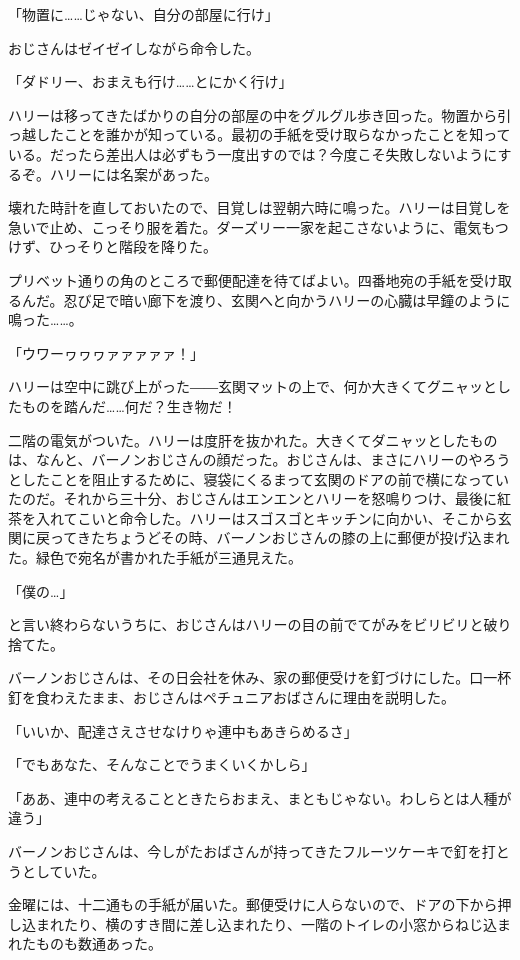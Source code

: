 \documentclass[10pt,a4paper]{article}
\begin{document}
\begin{CJK}{UTF8}{min}
「物置に……じゃない、自分の部屋に行け」

おじさんはゼイゼイしながら命令した。

「ダドリー、おまえも行け……とにかく行け」

ハリーは移ってきたばかりの自分の部屋の中をグルグル歩き回った。物置から引っ越したことを誰かが知っている。最初の手紙を受け取らなかったことを知っている。だったら差出人は必ずもう一度出すのでは？今度こそ失敗しないようにするぞ。ハリーには名案があった。

壊れた時計を直しておいたので、目覚しは翌朝六時に鳴った。ハリーは目覚しを急いで止め、こっそり服を着た。ダーズリー一家を起こさないように、電気もつけず、ひっそりと階段を降りた。

プリベット通りの角のところで郵便配達を待てばよい。四番地宛の手紙を受け取るんだ。忍び足で暗い廊下を渡り、玄関へと向かうハリーの心臓は早鐘のように鳴った……。

「ウワーヮヮヮァァァァァ！」

ハリーは空中に跳び上がった――玄関マットの上で、何か大きくてグニャッとしたものを踏んだ……何だ？生き物だ！

二階の電気がついた。ハリーは度肝を抜かれた。大きくてダニャッとしたものは、なんと、バーノンおじさんの顔だった。おじさんは、まさにハリーのやろうとしたことを阻止するために、寝袋にくるまって玄関のドアの前で横になっていたのだ。それから三十分、おじさんはエンエンとハリーを怒鳴りつけ、最後に紅茶を入れてこいと命令した。ハリーはスゴスゴとキッチンに向かい、そこから玄関に戻ってきたちょうどその時、バーノンおじさんの膝の上に郵便が投げ込まれた。緑色で宛名が書かれた手紙が三通見えた。

「僕の…」

と言い終わらないうちに、おじさんはハリーの目の前でてがみをビリビリと破り捨てた。

バーノンおじさんは、その日会社を休み、家の郵便受けを釘づけにした。口一杯釘を食わえたまま、おじさんはペチュニアおばさんに理由を説明した。

「いいか、配達さえさせなけりゃ連中もあきらめるさ」

「でもあなた、そんなことでうまくいくかしら」

「ああ、連中の考えることときたらおまえ、まともじゃない。わしらとは人種が違う」

バーノンおじさんは、今しがたおばさんが持ってきたフルーツケーキで釘を打とうとしていた。



金曜には、十二通もの手紙が届いた。郵便受けに人らないので、ドアの下から押し込まれたり、横のすき間に差し込まれたり、一階のトイレの小窓からねじ込まれたものも数通あった。


\end{CJK}
\end{document}
